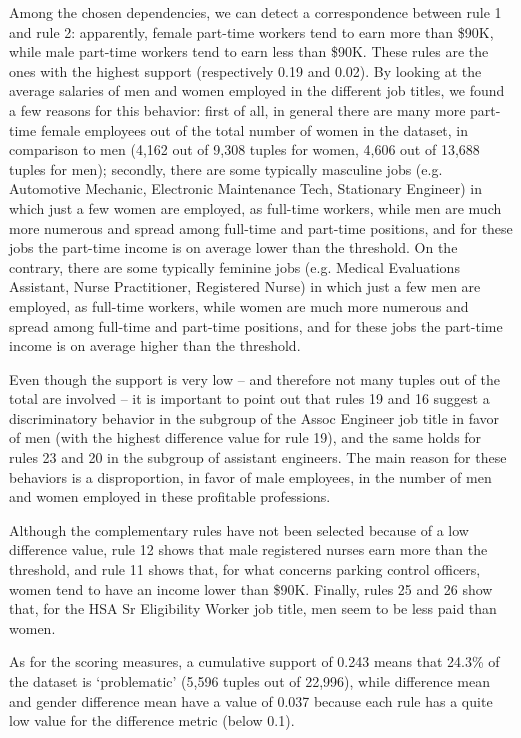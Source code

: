 Among the chosen dependencies, we can detect a correspondence between rule 1 and rule 2: apparently, female part-time workers tend to earn more than \$90K, while male part-time workers tend to earn less than \$90K. These rules are the ones with the highest support (respectively 0.19 and 0.02). By looking at the average salaries of men and women employed in the different job titles, we found a few reasons for this behavior: first of all, in general there are many more part-time female employees out of the total number of women in the dataset, in comparison to men (4,162 out of 9,308 tuples for women, 4,606 out of 13,688 tuples for men); secondly, there are some typically masculine jobs (e.g. Automotive Mechanic, Electronic Maintenance Tech, Stationary Engineer) in which just a few women are employed, as full-time workers, while men are much more numerous and spread among full-time and part-time positions, and for these jobs the part-time income is on average lower than the threshold. On the contrary, there are some typically feminine jobs (e.g. Medical Evaluations Assistant, Nurse Practitioner, Registered Nurse) in which just a few men are employed, as full-time workers, while women are much more numerous and spread among full-time and part-time positions, and for these jobs the part-time income is on average higher than the threshold.

Even though the support is very low -- and therefore not many tuples out of the total are involved -- it is important to point out that rules 19 and 16 suggest a discriminatory behavior in the subgroup of the Assoc Engineer job title in favor of men (with the highest difference value for rule 19), and the same holds for rules 23 and 20 in the subgroup of assistant engineers. The main reason for these behaviors is a disproportion, in favor of male employees, in the number of men and women employed in these profitable professions.

Although the complementary rules have not been selected because of a low difference value, rule 12 shows that male registered nurses earn more than the threshold, and rule 11 shows that, for what concerns parking control officers, women tend to have an income lower than \$90K. Finally, rules 25 and 26 show that, for the HSA Sr Eligibility Worker job title, men seem to be less paid than women.

As for the scoring measures, a cumulative support of 0.243 means that 24.3\% of the dataset is `problematic' (5,596 tuples out of 22,996), while difference mean and gender difference mean have a value of 0.037 because each rule has a quite low value for the difference metric (below 0.1).

